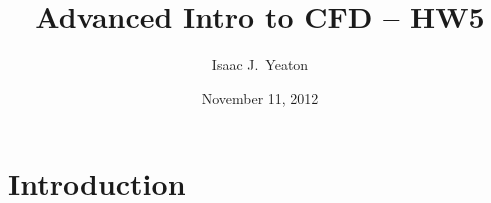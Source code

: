 \documentclass[11pt, letterpaper]{article}
\title{Advanced Intro to CFD -- HW5}
\author{Isaac J.~Yeaton}
\date{November 11, 2012}
\begin{document}
\maketitle
\thispagestyle{empty}


\section{Introduction}
\end{document}
